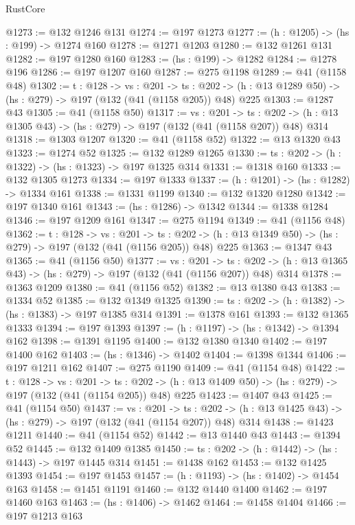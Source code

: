 \begin{lexlean}{RustCore}
\begin{coremodule}
@1273 := @132 @1246 @131
@1274 := @197 @1273
@1277 := (h : @1205) -> (hs : @199) -> @1274 @160
@1278 := @1271 @1203
@1280 := @132 @1261 @131
@1282 := @197 @1280 @160
@1283 := (hs : @199) -> @1282
@1284 := @1278 @196
@1286 := @197 @1207 @160
@1287 := @275 @1198
@1289 := @41 (@1158 @48)
@1302 := {t : @128} ->
  {vs : @201} ->
  {ts : @202} -> (h : @13 @1289 @50) -> (hs : @279) -> @197 (@132 (@41 (@1158 @205)) @48) @225
@1303 := @1287 @43
@1305 := @41 (@1158 @50)
@1317 := {vs : @201} ->
  {ts : @202} -> (h : @13 @1305 @43) -> (hs : @279) -> @197 (@132 (@41 (@1158 @207)) @48) @314
@1318 := @1303 @1207
@1320 := @41 (@1158 @52)
@1322 := @13 @1320 @43
@1323 := @1274 @52
@1325 := @132 @1289 @1265
@1330 := {ts : @202} -> (h : @1322) -> (hs : @1323) -> @197 @1325 @314
@1331 := @1318 @160
@1333 := @132 @1305 @1273
@1334 := @197 @1333
@1337 := (h : @1201) -> (hs : @1282) -> @1334 @161
@1338 := @1331 @1199
@1340 := @132 @1320 @1280
@1342 := @197 @1340 @161
@1343 := (hs : @1286) -> @1342
@1344 := @1338 @1284
@1346 := @197 @1209 @161
@1347 := @275 @1194
@1349 := @41 (@1156 @48)
@1362 := {t : @128} ->
  {vs : @201} ->
  {ts : @202} -> (h : @13 @1349 @50) -> (hs : @279) -> @197 (@132 (@41 (@1156 @205)) @48) @225
@1363 := @1347 @43
@1365 := @41 (@1156 @50)
@1377 := {vs : @201} ->
  {ts : @202} -> (h : @13 @1365 @43) -> (hs : @279) -> @197 (@132 (@41 (@1156 @207)) @48) @314
@1378 := @1363 @1209
@1380 := @41 (@1156 @52)
@1382 := @13 @1380 @43
@1383 := @1334 @52
@1385 := @132 @1349 @1325
@1390 := {ts : @202} -> (h : @1382) -> (hs : @1383) -> @197 @1385 @314
@1391 := @1378 @161
@1393 := @132 @1365 @1333
@1394 := @197 @1393
@1397 := (h : @1197) -> (hs : @1342) -> @1394 @162
@1398 := @1391 @1195
@1400 := @132 @1380 @1340
@1402 := @197 @1400 @162
@1403 := (hs : @1346) -> @1402
@1404 := @1398 @1344
@1406 := @197 @1211 @162
@1407 := @275 @1190
@1409 := @41 (@1154 @48)
@1422 := {t : @128} ->
  {vs : @201} ->
  {ts : @202} -> (h : @13 @1409 @50) -> (hs : @279) -> @197 (@132 (@41 (@1154 @205)) @48) @225
@1423 := @1407 @43
@1425 := @41 (@1154 @50)
@1437 := {vs : @201} ->
  {ts : @202} -> (h : @13 @1425 @43) -> (hs : @279) -> @197 (@132 (@41 (@1154 @207)) @48) @314
@1438 := @1423 @1211
@1440 := @41 (@1154 @52)
@1442 := @13 @1440 @43
@1443 := @1394 @52
@1445 := @132 @1409 @1385
@1450 := {ts : @202} -> (h : @1442) -> (hs : @1443) -> @197 @1445 @314
@1451 := @1438 @162
@1453 := @132 @1425 @1393
@1454 := @197 @1453
@1457 := (h : @1193) -> (hs : @1402) -> @1454 @163
@1458 := @1451 @1191
@1460 := @132 @1440 @1400
@1462 := @197 @1460 @163
@1463 := (hs : @1406) -> @1462
@1464 := @1458 @1404
@1466 := @197 @1213 @163

\end{coremodule}
\end{lexlean}
